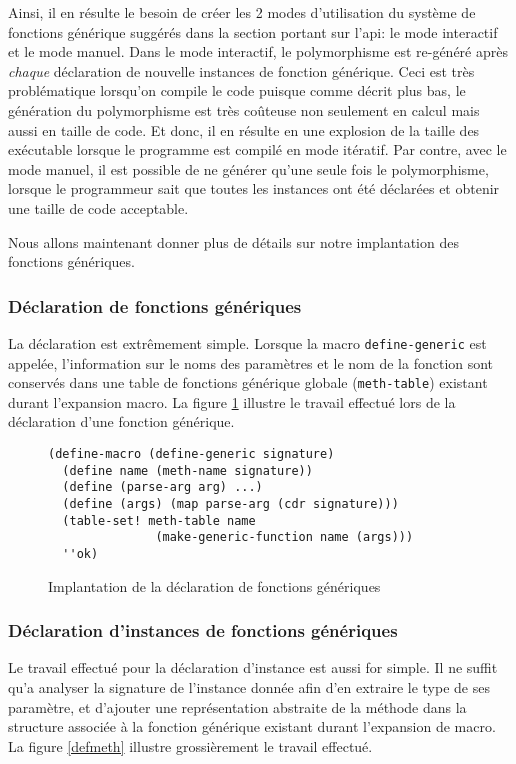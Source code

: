     Ainsi, il en résulte le besoin de créer les 2 modes d'utilisation
    du système de fonctions générique suggérés dans la section portant
    sur l'api: le mode interactif et le mode manuel. Dans le mode
    interactif, le polymorphisme est re-généré après \emph{chaque}
    déclaration de nouvelle instances de fonction générique. Ceci est
    très problématique lorsqu'on compile le code puisque comme décrit
    plus bas, le génération du polymorphisme est très coûteuse non
    seulement en calcul mais aussi en taille de code. Et donc, il en
    résulte en une explosion de la taille des exécutable lorsque le
    programme est compilé en mode itératif. Par contre, avec le mode
    manuel, il est possible de ne générer qu'une seule fois le
    polymorphisme, lorsque le programmeur sait que toutes les
    instances ont été déclarées et obtenir une taille de code
    acceptable.

    Nous allons maintenant donner plus de détails sur notre
    implantation des fonctions génériques.

    \subsubsection{Déclaration de fonctions génériques}
      La déclaration est extrêmement simple. Lorsque la macro
      \texttt{define-generic} est appelée, l'information sur le noms
      des paramètres et le nom de la fonction sont conservés dans une
      table de fonctions générique globale (\texttt{meth-table})
      existant durant l'expansion macro. La figure \ref{defgen}
      illustre le travail effectué lors de la déclaration d'une
      fonction générique.

      \begin{figure}[h!]
        \begin{lstlisting}
(define-macro (define-generic signature)
  (define name (meth-name signature))
  (define (parse-arg arg) ...)
  (define (args) (map parse-arg (cdr signature)))
  (table-set! meth-table name 
               (make-generic-function name (args)))
  ''ok)
        \end{lstlisting}
        \caption{Implantation de la déclaration de fonctions
          génériques}
        \label{defgen}
      \end{figure}
    
    \subsubsection{Déclaration d'instances de fonctions génériques}
      Le travail effectué pour la déclaration d'instance est aussi for
      simple. Il ne suffit qu'a analyser la signature de l'instance
      donnée afin d'en extraire le type de ses paramètre, et d'ajouter
      une représentation abstraite de la méthode dans la structure
      associée à la fonction générique existant durant l'expansion de
      macro. La figure \ref{defmeth} illustre grossièrement le travail
      effectué.

